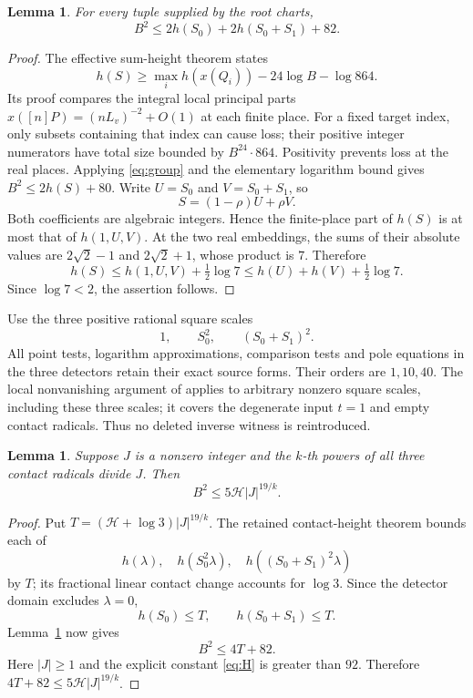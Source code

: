 \documentclass[11pt,a4paper]{article}
\newtheorem{lemma}[theorem]{Lemma}
\theoremstyle{remark}\newtheorem{remark}[theorem]{Remark}
\newcommand{\HH}{\mathcal H}
\begin{document}
\begin{lemma}\label{lem:height}
For every tuple supplied by the root charts,
\[
                  B^2\le2h(S_0)+2h(S_0+S_1)+82.
\]
\end{lemma}
\begin{proof}
The effective sum-height theorem \cite{EffectiveSums} states
\[
 h(S)\ge\max_i h(x(Q_i))-24\log B-\log864.
\]
Its proof compares the integral local principal parts
$x([n]P)=(nL_v)^{-2}+O(1)$ at each finite place.
For a fixed target index, only subsets containing that index
can cause loss; their positive integer numerators have total
size bounded by $B^{24}\cdot864$. Positivity prevents loss
at the real places. Applying \eqref{eq:group} and the elementary
logarithm bound gives $B^2\le2h(S)+80$.
Write $U=S_0$ and $V=S_0+S_1$, so
\[
                         S=(1-\rho)U+\rho V.
\]
Both coefficients are algebraic integers. Hence the finite-place
part of $h(S)$ is at most that of $h(1,U,V)$. At the two real
embeddings, the sums of their absolute values are $2\sqrt2-1$
and $2\sqrt2+1$, whose product is $7$. Therefore
\[
 h(S)\le h(1,U,V)+\tfrac12\log7
       \le h(U)+h(V)+\tfrac12\log7.
\]
Since $\log7<2$, the assertion follows.
\end{proof}

Use the three positive rational square scales
\begin{equation}\label{eq:scales}
                      1,\qquad S_0^2,\qquad(S_0+S_1)^2.
\end{equation}
All point tests, logarithm approximations, comparison tests and
pole equations in the three detectors retain their exact source
forms. Their orders are $1,10,40$. The local nonvanishing argument
of \cite{Quartic389} applies to arbitrary nonzero square scales,
including these three scales; it covers the degenerate input
$t=1$ and empty contact radicals. Thus no deleted inverse
witness is reintroduced.

\begin{lemma}\label{lem:divheight}
Suppose $J$ is a nonzero integer and the $k$-th powers of all
three contact radicals divide $J$. Then
\[
                  B^2\le5\HH|J|^{19/k}.
\]
\end{lemma}
\begin{proof}
Put $T=(\HH+\log3)|J|^{19/k}$. The retained contact-height
theorem bounds each of
\[
 h(\lambda),\quad h(S_0^2\lambda),\quad
 h((S_0+S_1)^2\lambda)
\]
by $T$; its fractional linear contact change accounts for
$\log3$. Since the detector domain excludes $\lambda=0$,
\[
                    h(S_0)\le T,\qquad h(S_0+S_1)\le T.
\]
Lemma~\ref{lem:height} now gives
\[
                            B^2\le4T+82.
\]
Here $|J|\ge1$ and the explicit constant \eqref{eq:H} is
greater than $92$. Therefore $4T+82\le5\HH|J|^{19/k}$.
\end{proof}
\end{document}
